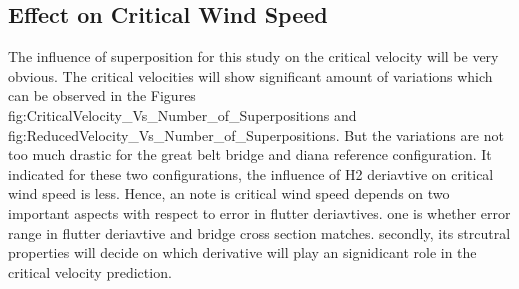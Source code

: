 \documentclass[../main]{subfiles}
\begin{document}




\subsection{Effect on Critical Wind Speed}

The influence of superposition for this study on the critical velocity will be very obvious. 
The critical velocities will show significant amount of variations which can be observed in the 
Figures {fig:CriticalVelocity_Vs_Number_of_Superpositions} and {fig:ReducedVelocity_Vs_Number_of_Superpositions}. 
But the variations are not too much drastic for the great belt bridge and diana reference configuration. 
It indicated for these two configurations, the influence of H2 deriavtive on critical wind speed is less. 
Hence, an note is critical wind speed depends on two important aspects with respect to error in flutter deriavtives. 
one is whether error range in flutter deriavtive and bridge cross section matches. secondly, its strcutral 
properties will decide on which derivative will play an signidicant role in the critical velocity prediction. 
\end{document}
